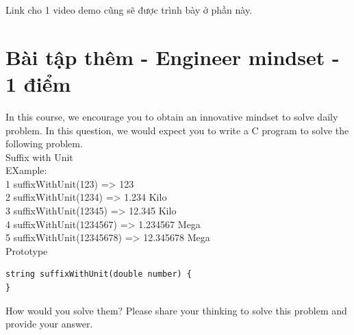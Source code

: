 \begin{center}
\end{center}


Link cho 1 video demo cũng sẽ được trình bày ở phần này.


\begin{center}
\end{center}



\section{Bài tập thêm - Engineer mindset - 1 điểm}
In this course, we encourage you to obtain an innovative mindset to solve daily problem. In this question, we would expect you to write a C program to solve the following problem. \\

Suffix with Unit\\

EXample:\\

1 suffixWithUnit(123) => 123\\

2 suffixWithUnit(1234) => 1.234 Kilo\\

3 suffixWithUnit(12345) => 12.345 Kilo\\

4 suffixWithUnit(1234567) => 1.234567 Mega\\

5 suffixWithUnit(12345678) => 12.345678 Mega\\


Prototype
\begin{lstlisting}
string suffixWithUnit(double number) {
}
\end{lstlisting}

How would you solve them? Please share your thinking to solve this problem and provide your answer.  


